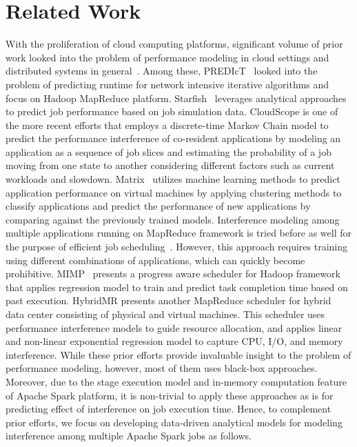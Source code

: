 \section{Related Work}
\label{related}
\noindent
With the proliferation of cloud computing platforms, significant volume of prior work looked into the problem of performance modeling in cloud settings and distributed systems in general~\cite{predict, nosqlmodel, pmodel, starfish, oltp, prepare, cloudopt, cloudscale, dbseer, amml}. 
Among these, PREDIcT~\cite{predict} looked into the problem of predicting runtime for network intensive iterative algorithms and focus on Hadoop MapReduce platform. Starfish~\cite{starfish} leverages analytical approaches to predict job performance based on job simulation data. CloudScope \cite{chen2015cloudscope} is one of the more recent efforts that employs a discrete-time Markov Chain model to predict the performance interference of co-resident applications by modeling an application as a sequence of job slices and estimating the probability of a job moving from one state to another considering different factors such as current workloads and slowdown. Matrix~\cite{chiang2014matrix} utilizes machine learning methods to predict application performance on virtual machines by applying clustering methods to classify applications and predict the performance of new applications by comparing against  the previously trained models. 
\noindent
Interference modeling among multiple applications running on MapReduce framework is tried before as well for the purpose of efficient job scheduling~\cite{bu2013interference}. However, this approach requires training using different combinations of applications, which can quickly become prohibitive. MIMP~\cite{zhangmimp} presents a progress aware scheduler for Hadoop framework that applies regression model to train and predict task completion time based on past execution. HybridMR \cite{sharma2013hybridmr} presents another MapReduce scheduler for hybrid data center consisting of physical and virtual machines. This scheduler uses performance interference models to guide resource allocation, and applies linear and non-linear exponential regression model to capture CPU, I/O, and memory interference. 
\noindent
While these prior efforts provide invaluable insight to the problem of performance modeling, however, most of them uses black-box approaches. Moreover, due to the stage execution model and in-memory computation feature of Apache Spark platform, it is non-trivial to apply these approaches as is for predicting effect of interference on job execution time. Hence, to complement prior efforts, we focus on developing data-driven analytical models for modeling interference among multiple Apache Spark jobs as follows. 

